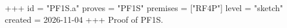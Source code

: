 +++
id = "PF1S.a"
proves = "PF1S"
premises = ["RF4P"]
level = "sketch"
created = 2026-11-04
+++
Proof of PF1S.
